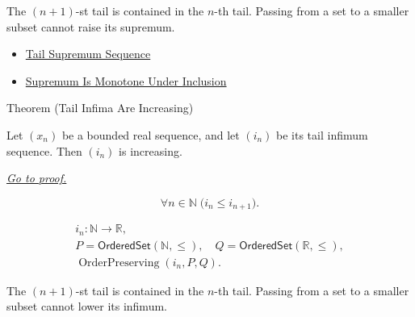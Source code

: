\begin{remark*}[Interpretation]
The $(n+1)$-st tail is contained in the $n$-th tail. Passing from a set to a
smaller subset cannot raise its supremum.
\end{remark*}

\begin{dependencies}
\begin{itemize}
  \item \hyperref[def:tail-supremum-sequence]{Tail Supremum Sequence}
  \item \hyperref[thm:supremum-is-monotone-under-inclusion]{Supremum Is Monotone Under Inclusion}
\end{itemize}
\end{dependencies}


\begin{theorembox}{Theorem (Tail Infima Are Increasing)}
\begin{theorem}
\label{thm:tail-infima-are-increasing}
Let $(x_n)$ be a bounded real sequence, and let $(i_n)$ be its tail
infimum sequence. Then $(i_n)$ is increasing.

\smallskip
\noindent
\hyperref[prf:tail-infima-are-increasing]{\textit{Go to proof.}}
\end{theorem}
\end{theorembox}

\begin{remark*}
\[
\forall n\in\mathbb{N}\;\bigl(i_n\le i_{n+1}\bigr).
\]
\end{remark*}

\begin{remark*}
\[
\begin{gathered}
i_n\colon\mathbb{N}\to\mathbb{R},\\
P=\mathsf{OrderedSet}(\mathbb{N},\leq),\quad
Q=\mathsf{OrderedSet}(\mathbb{R},\leq),\\
\operatorname{OrderPreserving}(i_n,P,Q).
\end{gathered}
\]
\end{remark*}

\begin{remark*}[Interpretation]
The $(n+1)$-st tail is contained in the $n$-th tail. Passing from a set to a
smaller subset cannot lower its infimum.
\end{remark*}

